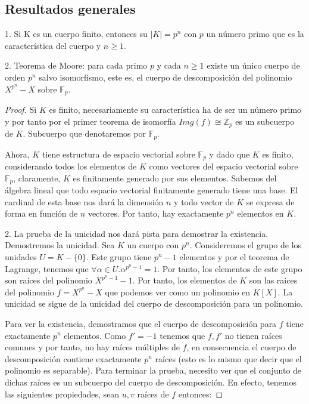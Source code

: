 \subsection{Resultados generales}

\begin{theorem}
1. Si K es un cuerpo finito, entonces su $|K| = p^n$ con $p$ un número primo que es la característica del cuerpo y $n \ge 1$. 

2. Teorema de Moore: para cada primo $p$ y cada $n \ge 1$ existe un único cuerpo de orden $p^n$ salvo isomorfismo, este es, el cuerpo de descomposición del polinomio $X^{p^n} - X$ sobre $\mathbb{F}_p$. 
\end{theorem}
\begin{proof}
Si $K$ es finito, necesariamente su característica ha de ser un número primo y por tanto por el primer teorema de isomorfía $Img(f) \cong \mathbb{Z}_p$ es un subcuerpo de $K$. Subcuerpo que denotaremos por $\mathbb{F}_p$.

Ahora, $K$ tiene estructura de espacio vectorial sobre $\mathbb{F}_p$ y dado que $K$ es finito, considerando todos los elementos de $K$ como vectores del espacio vectorial sobre $\mathbb{F}_p$, claramente, $K$ es finitamente generado por sus elementos. Sabemos del álgebra lineal que todo espacio vectorial finitamente generado tiene una base. El cardinal de esta base nos dará la dimensión $n$ y todo vector de $K$ se expresa de forma en función de $n$ vectores. Por tanto, hay exactamente $p^n$ elementos en $K$. 

2. La prueba de la unicidad nos dará pista para demostrar la existencia. Demostremos la unicidad. Sea $K$ un cuerpo con $p^n$. Consideremos el grupo de los unidades $U = K-\{0\}$. Este grupo tiene $p^n - 1$ elementos y por el teorema de Lagrange, tenemos que $\forall \alpha \in U. \alpha^{p^n - 1} = 1$. Por tanto, los elementos de este grupo son raíces del polinomio $X^{p^n-1}-1$. Por tanto, los elementos de $K$ son las raíces del polinomio $f = X^{p^n}-X$ que podemos ver como un polinomio en $K[X]$. La unicidad se sigue de la unicidad del cuerpo de descomposición para un polinomio.

Para ver la existencia, demostramos que el cuerpo de descomposición para $f$ tiene exactamente $p^n$ elementos. Como $f' = -1$ tenemos que $f,f'$ no tienen raíces comunes y por tanto, no hay raíces múltiples de $f$, en consecuencia el cuerpo de descomposición contiene exactamente $p^n$ raíces (esto es lo mismo que decir que el polinomio es separable). Para terminar la prueba, necesito ver que el conjunto de dichas raíces es un subcuerpo del cuerpo de descomposición. En efecto, tenemos las siguientes propiedades, sean $u,v$ raíces de $f$ entonces:


\end{proof}
